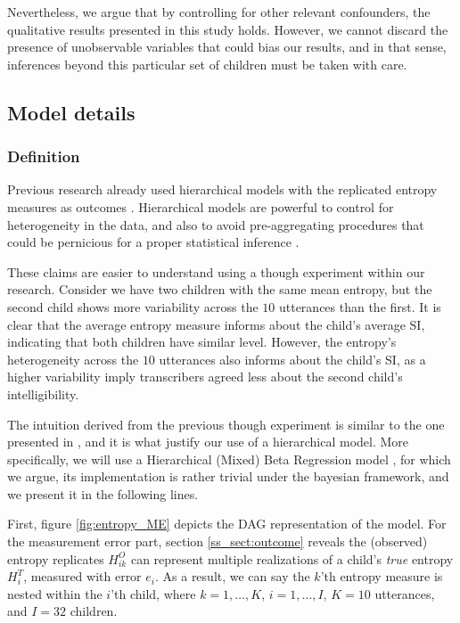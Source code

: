Nevertheless, we argue that by controlling for other relevant confounders, the qualitative results presented in this study holds. However, we cannot discard the presence of unobservable variables that could bias our results, and in that sense, inferences beyond this particular set of children must be taken with care.
%
%
\subsection{Model details} \label{sSA:model_details}
%
\subsubsection{Definition} \label{ssSA:model_definition}
%
Previous research already used hierarchical models with the replicated entropy measures as outcomes \citep{Boonen_et_al_2021, Faes_et_al_2021}. Hierarchical models are powerful to control for heterogeneity in the data, and also to avoid pre-aggregating procedures that could be pernicious for a proper statistical inference \citep{McElreath_2020}. 

These claims are easier to understand using a though experiment within our research. Consider we have two children with the same mean entropy, but the second child shows more variability across the $10$ utterances than the first. It is clear that the average entropy measure informs about the child's average SI, indicating that both children have similar level. However, the entropy's heterogeneity across the $10$ utterances also informs about the child's SI, as a higher variability imply transcribers agreed less about the second child's intelligibility.

The intuition derived from the previous though experiment is similar to the one presented in \citet{Boonen_et_al_2021}, and it is what justify our use of a hierarchical model. More specifically, we will use a Hierarchical (Mixed) Beta Regression model \citep{Figueroa-Zuniga_et_al_2013}, for which we argue, its implementation is rather trivial under the bayesian framework, and we present it in the following lines.

First, figure \ref{fig:entropy_ME} depicts the DAG representation of the model. For the measurement error part, section \ref{ss_sect:outcome} reveals the (observed) entropy replicates $H^{O}_{ik}$ can represent multiple realizations of a child's \textit{true} entropy $H^{T}_{i}$, measured with error $e_i$. As a result, we can say the $k$'th entropy measure is nested within the $i$'th child, where $k=1, \dots, K$, $i=1, \dots, I$, $K = 10$ utterances, and $I = 32$ children.

